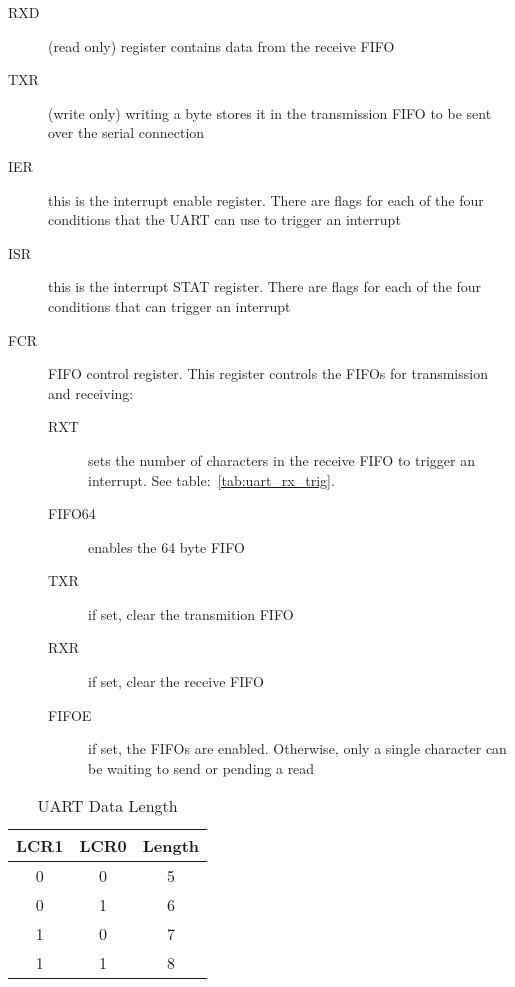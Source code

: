 \begin{description}
    \item[RXD] (read only) register contains data from the receive FIFO

    \item[TXR] (write only) writing a byte stores it in the transmission FIFO to be sent over the serial connection

    \item[IER] this is the interrupt enable register. There are flags for each of the four conditions that the UART can use to trigger an interrupt

    \item[ISR] this is the interrupt STAT register. There are flags for each of the four conditions that can trigger an interrupt

    \item[FCR] FIFO control register. This register controls the FIFOs for transmission and receiving:
        \begin{description}
            \item[RXT] sets the number of characters in the receive FIFO to trigger an interrupt. See table:~\ref{tab:uart_rx_trig}.

            \item[FIFO64] enables the 64 byte FIFO

            \item[TXR] if set, clear the transmition FIFO

            \item[RXR] if set, clear the receive FIFO

            \item[FIFOE] if set, the FIFOs are enabled. Otherwise, only a single character can be waiting to send or pending a read
        \end{description}
\end{description}

\begin{table}[ht]
    \begin{center}
        \begin{tabular}{|c|c|c|} \hline
            LCR1 & LCR0 & Length \\ \hline\hline
            0 & 0 & 5 \\ \hline
            0 & 1 & 6 \\ \hline
            1 & 0 & 7 \\ \hline
            1 & 1 & 8 \\ \hline
        \end{tabular}
    \end{center}
    \caption{UART Data Length}
    \label{tab:uart_data}
\end{table}

